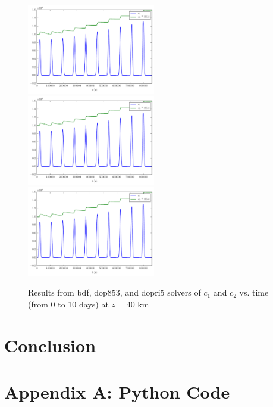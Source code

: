 \documentclass[twocolumn,10pt]{asme2ej}
\begin{document}
\begin{figure}[thb]
\begin{center}
\includegraphics[width=0.5\textwidth]{figure/bdf time.pdf}
\includegraphics[width=0.5\textwidth]{figure/dop853 time.pdf}
\includegraphics[width=0.5\textwidth]{figure/dopri5 time.pdf}
\caption{Results from bdf, dop853, and dopri5 solvers of $c_1$ and $c_2$ vs. time (from 0 to 10 days) at $z = 40$ km}
\label{10 days}
\end{center}
\end{figure}

\section{Conclusion}

\nocite{*}



\clearpage
\onecolumn
\appendix       %
\section*{Appendix A: Python Code}




\end{document}
